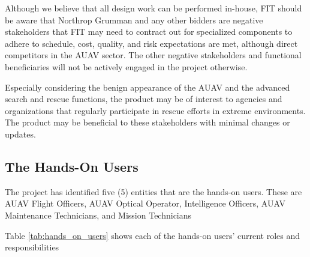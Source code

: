 \begin{fullwidth}
    Although we believe that all design work can be performed in-house, FIT should be aware that Northrop Grumman and any other bidders are negative stakeholders that FIT may need to contract out for specialized components to adhere to schedule, cost, quality, and risk expectations are met, although direct competitors in the AUAV sector. The other negative stakeholders and functional beneficiaries will not be actively engaged in the project otherwise.
    
    Especially considering the benign appearance of the AUAV and the advanced search and rescue functions, the product may be of interest to agencies and organizations that regularly participate in rescue efforts in extreme environments. The product may be beneficial to these stakeholders with minimal changes or updates. 
    
    \subsection{The Hands-On Users}
    The project has identified five (5) entities that are the hands-on users. These are AUAV Flight Officers, AUAV Optical Operator, Intelligence Officers, AUAV Maintenance Technicians, and Mission Technicians

    Table \ref{tab:hands_on_users} shows each of the hands-on users’ current roles and responsibilities
    

\end{fullwidth}
